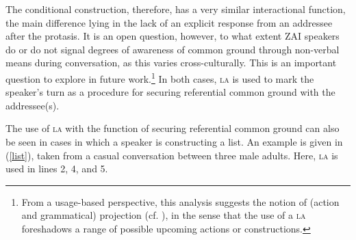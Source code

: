 The conditional construction, therefore, has a very similar interactional function, the main difference lying in the lack of an explicit response from an addressee after the protasis. It is an open question, however, to what extent ZAI speakers do or do not signal degrees of awareness of common ground through non-verbal means during conversation, as this varies cross-culturally. This is an important question to explore in future work.\footnote{From a usage-based perspective, this analysis suggests the notion of (action and grammatical) projection (cf. \citealt{auer2005}), in the sense that the use of a \textsc{la} foreshadows a range of possible upcoming actions or constructions.} In both cases, \textsc{la} is used to mark the speaker's turn as a procedure for securing referential common ground with the addressee(s). 

The use of \textsc{la} with the function of securing referential common ground can also be seen in cases in which a speaker is constructing a list. An example is given in (\ref{list}), taken from a casual conversation between three male adults. Here, \textsc{la} is used in lines 2, 4, and 5. 

